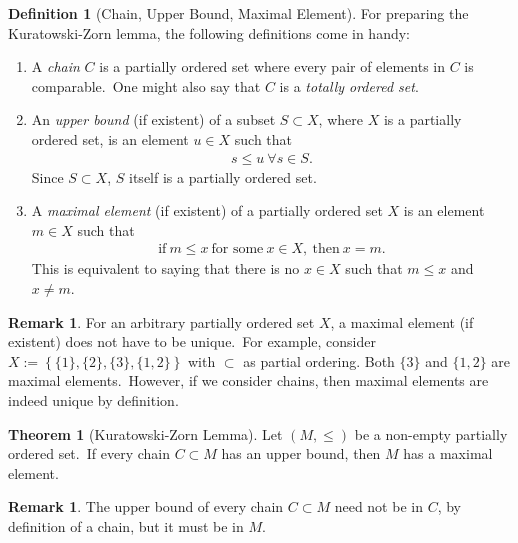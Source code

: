 \documentclass[12pt, a4paper]{article}
\numberwithin{equation}{section}
\theoremstyle{definition}
\theoremstyle{definition}
\newtheorem{defn}[thm]{Definition} %
\newtheorem{remark}[thm]{Remark} %
\newtheorem{theorem}[thm]{Theorem}
\begin{document}
	\begin{defn}[Chain, Upper Bound, Maximal Element]
	For preparing the Kuratowski-Zorn lemma, the following definitions come in handy: 
		\begin{enumerate}[label=\alph*)]
			\item A \textit{chain} $C$ is a partially ordered set where every pair of elements in $C$ is comparable.\ One might also say that $C$ is a \textit{totally ordered set}. 
			\item An \textit{upper bound} (if existent)  of a subset $S\subset X$, where $X$ is a partially ordered set, is an element $u\in X$ such that 
			\begin{align}
				s \leq u \ \forall s\in S. 
			\end{align}
			Since $S\subset X$, $S$ itself is a partially ordered set. 
			\item A \textit{maximal element} (if existent) of a partially ordered set $X$ is an element $m\in X$ such that 
			\begin{align}
				\text{if}\ m\leq x \ \text{for some}\ x\in X,\ \text{then}\ x=m.
			\end{align}
			This is equivalent to saying that there is no $x\in X$ such that $m\leq x$ and $x\ne m$. 
		\end{enumerate}
	\end{defn}

	\begin{remark}
		For an arbitrary partially ordered set $X$, a maximal element (if existent) does not have to be unique.\ For example, consider $X := \left\{ \{1\}, \{2\}, \{3\}, \{1, 2\} \right\}$ with $\subset$ as partial ordering. Both $\{3\}$ and $\{1, 2\}$ are maximal elements.\ However, if we consider chains, then maximal elements are indeed unique by definition. 
	\end{remark}

	\begin{theorem}[Kuratowski-Zorn Lemma]
		Let $\left(M, \leq\right)$ be a non-empty partially ordered set.\ If every chain $C\subset M$ has an upper bound, then $M$ has a maximal element. 
	\end{theorem}

	\begin{remark}
		The upper bound of every chain $C\subset M$ need not be in $C$, by definition of a chain, but it must be in $M$. 
	\end{remark}
	
	\newpage 
\end{document}
